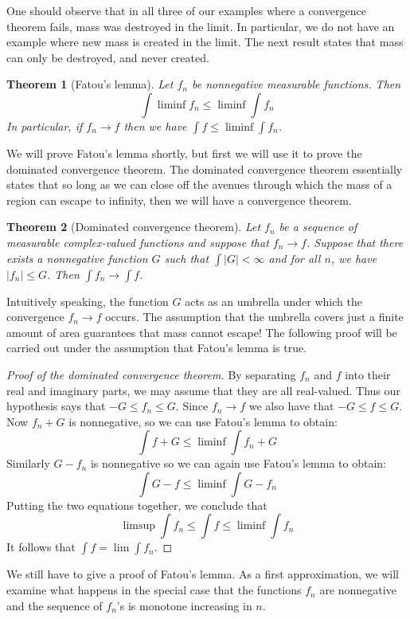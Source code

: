\documentclass[10pt,oneside]{amsbook}
\theoremstyle{definition}
\theoremstyle{plain}
\newtheorem{thm}{Theorem}[section]
\theoremstyle{definition}
\theoremstyle{remark}
\numberwithin{equation}{section}
\numberwithin{figure}{section}
\begin{document}
One should observe that in all three of our examples where a convergence theorem fails, mass was destroyed in the limit. In particular, we do not have an example where new mass is created in the limit. The next result states that mass can only be destroyed, and never created.

\begin{thm}[Fatou's lemma]
  Let $f_n$ be nonnegative measurable functions. Then
  \[\int\liminf f_n\leq\liminf\int f_n
  \]
  In particular, if $f_n\to f$ then we have $\int f\leq\liminf\int f_n$.
\end{thm}

We will prove Fatou's lemma shortly, but first we will use it to prove the dominated convergence theorem. The dominated convergence theorem essentially states that so long as we can close off the avenues through which the mass of a region can escape to infinity, then we will have a convergence theorem.

\begin{thm}[Dominated convergence theorem]
  Let $f_n$ be a sequence of measurable complex-valued functions and suppose that $f_n\to f$. Suppose that there exists a nonnegative function $G$ such that $\int|G|<\infty$ and for all $n$, we have $|f_n|\leq G$. Then $\int f_n\to \int f$.
\end{thm}

Intuitively speaking, the function $G$ acts as an umbrella under which the convergence $f_n\to f$ occurs. The assumption that the umbrella covers just a finite amount of area guarantees that mass cannot escape! The following proof will be carried out under the assumption that Fatou's lemma is true.

\begin{proof}[Proof of the dominated convergence theorem]
  By separating $f_n$ and $f$ into their real and imaginary parts, we may assume that they are all real-valued. Thus our hypothesis says that $-G\leq f_n\leq G$. Since $f_n\to f$ we also have that $-G\leq f\leq G$. Now $f_n+G$ is nonnegative, so we can use Fatou's lemma to obtain:
  \[\int f+G\leq\liminf\int f_n+G
  \]
  Similarly $G-f_n$ is nonnegative so we can again use Fatou's lemma to obtain:
  \[\int G-f\leq\liminf\int G-f_n
  \]
  Putting the two equations together, we conclude that
  \[\limsup\int f_n\leq\int f\leq\liminf\int f_n
  \]
  It follows that $\int f=\lim\int f_n$.
\end{proof}

We still have to give a proof of Fatou's lemma. As a first approximation, we will examine what happens in the special case that the functions $f_n$ are nonnegative and the sequence of $f_n$'s is monotone increasing in $n$.
\end{document}
